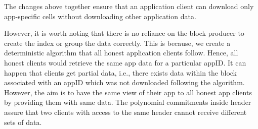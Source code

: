 \documentclass[sigconf, screen=true, nonacm]{acmart}
\newcommand{\DA}{\textit{DA layer}}
\begin{document}
        The changes above together ensure that an application client can download only app-specific cells without downloading other application data.

        However, it is worth noting that there is no reliance on the block producer to create the index or group the data correctly. This is because, we create a deterministic algorithm that all honest application clients follow. Hence, all honest clients would retrieve the same app data for a particular appID. It can happen that clients get partial data, i.e., there exists data within the block associated with an appID which was not downloaded following the algorithm. However, the aim is to have the same view of their app to all honest app clients by providing them with same data. The polynomial commitments inside header assure that two clients with access to the same header cannot receive different sets of data. 

        


\end{document}
